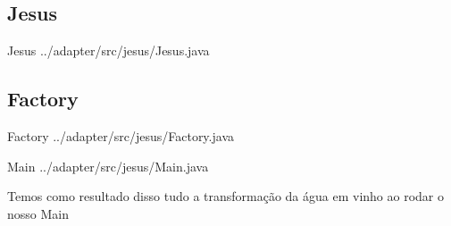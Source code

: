 \documentclass{if-beamer}
\begin{document}
\begin{frame}

	\subsection{Jesus}
	\begin{block}{Jesus}
		 {../adapter/src/jesus/Jesus.java}
	\end{block}

	\subsection{Factory}
	\begin{block}{Factory}
		 {../adapter/src/jesus/Factory.java}
	\end{block}

	
\end{frame}

\begin{frame}

	\begin{block}{Main}
		 {../adapter/src/jesus/Main.java}
	\end{block}

	\begin{exampleblock}

		Temos como resultado disso tudo a transformação da água em vinho ao rodar o nosso Main

	\end{exampleblock}
\end{frame}
\end{document}
